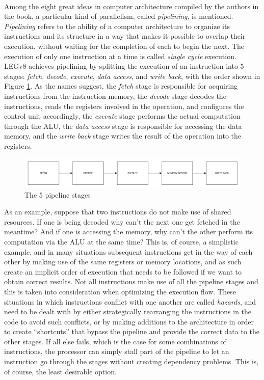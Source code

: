 \paragraph{}
Among the eight great ideas in computer architecture compiled by the authors in the book, a particular kind of  parallelism, called \emph{pipelining}, is mentioned.
\emph{Pipelining} refers to the ability of a computer architecture to organize its instructions and its structure in a way that makes it possible to overlap their execution, without waiting for the completion of each to begin the next. The execution of only one instruction at a time is called \emph{single cycle} execution. LEGv8 achieves pipelining by splitting the execution of an instruction into 5 stages: \emph{fetch}, \emph{decode}, \emph{execute}, \emph{data access}, and \emph{write back}, with the order shown in Figure \ref{fig:legv8pipeline}.
As the names suggest, the \emph{fetch} stage is responsible for acquiring instructions from the instruction memory, the \emph{decode} stage decodes the instructions, reads the registers involved in the operation, and configures the control unit accordingly, the \emph{execute} stage performs the actual computation through the ALU, the \emph{data access} stage is responsible for accessing the data memory, and the \emph{write back} stage writes the result of the operation into the registers.
\begin{figure}[H]
	\centering
	\includegraphics[width=1\textwidth]{img/5_stage_pipeline.png}
	\caption{The 5 pipeline stages}
        \label{fig:legv8pipeline}
\end{figure}
As an example, suppose that two instructions do not make use of shared resources. If one is being decoded why can't the next one get fetched in the meantime? And if one is accessing the memory, why can't the other perform its computation via the ALU at the same time? This is, of course, a simplistic example, and in many situations subsequent instructions get in the way of each other by making use of the same registers or memory locations, and as such create an implicit order of execution that needs to be followed if we want to obtain correct results.
Not all instructions make use of all the pipeline stages and this is taken into consideration when optimizing the execution flow.
These situations in which instructions conflict with one another are called \emph{hazards}, and need to be dealt with by either strategically rearranging the instructions in the code to avoid such conflicts, or by making additions to the architecture in order to create ``shortcuts'' that bypass the pipeline and provide the correct data to the other stages. If all else fails, which is the case for some combinations of instructions, the processor can simply stall part of the pipeline to let an instruction go through the stages without creating dependency problems. This is, of course, the least desirable option.

